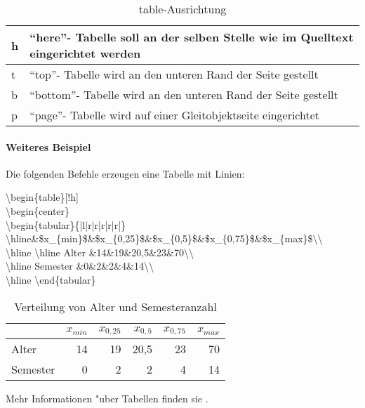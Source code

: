 \begin{table}[h]
\begin{center}
\begin{tabular}{|l|p{8cm}|}
\hline
h&``here''- Tabelle soll an der selben Stelle wie im Quelltext eingerichtet werden\\
\hline
t&``top''- Tabelle wird an den unteren Rand der Seite gestellt\\
\hline
b&``bottom''- Tabelle wird an den unteren Rand der Seite gestellt\\
\hline
p&``page''- Tabelle wird auf einer Gleitobjektseite eingerichtet\\
\hline
\end{tabular}
\end{center}
\caption{table-Ausrichtung }
\label{tab: table Ausrichtung}
\end{table}%

\paragraph{Weiteres Beispiel}
 
Die folgenden Befehle erzeugen eine Tabelle mit Linien: 

\textbackslash begin\{table\}[!h]\\
\textbackslash begin\{center\}\\
\textbackslash begin\{tabular\}\{|l|r|r|r|r|r|\}\\
\textbackslash hline\&\$x\_\{min\}\$\&\$x\_\{0,25\}\$\&\$x\_\{0,5\}\$\&\$x\_\{0,75\}\$\&\$x\_\{max\}\$\textbackslash\textbackslash\\
\textbackslash hline
\textbackslash hline Alter \&14\&19\&20,5\&23\&70\textbackslash\textbackslash\\
\textbackslash hline Semester \&0\&2\&2\&4\&14\textbackslash\textbackslash\\
\textbackslash hline
\textbackslash end\{tabular\}\\


\begin{table}[h]
\begin{center}
\begin{tabular}{|l|r|r|r|r|r|}
\hline&$x_{min}$&$x_{0,25}$&$x_{0,5}$&$x_{0,75}$&$x_{max}$\\
\hline
\hline Alter &14&19&20,5&23&70\\
\hline Semester &0&2&2&4&14\\
\hline
\end{tabular}
\end{center}
\caption{Verteilung von Alter und Semesteranzahl}
\end{table}


Mehr Informationen "uber Tabellen finden sie .



